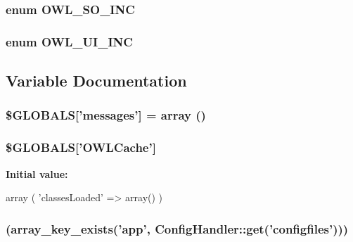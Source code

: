 \subsubsection[{OWL\_\-SO\_\-INC}]{\setlength{\rightskip}{0pt plus 5cm}enum {\bf OWL\_\-SO\_\-INC}}\label{OWLloader_8php_a75dffdef5ba58a0ba5f21ed40627897f}
\subsubsection[{OWL\_\-UI\_\-INC}]{\setlength{\rightskip}{0pt plus 5cm}enum {\bf OWL\_\-UI\_\-INC}}\label{OWLloader_8php_a2e11101c70f011a91d0d9c7f8e217738}


\subsection{Variable Documentation}
\subsubsection[{\$GLOBALS}]{\setlength{\rightskip}{0pt plus 5cm}\$GLOBALS\mbox{[}'messages'\mbox{]} = array ()}\label{OWLloader_8php_a65f2996116eed36e9ab25f254a470259}
\subsubsection[{\$GLOBALS}]{\setlength{\rightskip}{0pt plus 5cm}\$GLOBALS\mbox{[}'OWLCache'\mbox{]}}\label{OWLloader_8php_a79190ec221c2b52403f7324f1d224c8f}
{\bfseries Initial value:}
\begin{DoxyCode}
 array (
         'classesLoaded' => array()
)
\end{DoxyCode}
\subsubsection[{if}]{(array\_\-key\_\-exists('app', ConfigHandler::get('configfiles')))}\label{OWLloader_8php_a78407183564d6b92f2219d8a10b9349c}
